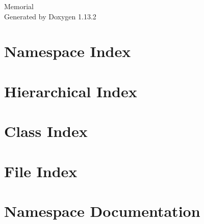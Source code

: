 \documentclass[twoside]{book}
\newcommand{\+}{\discretionary{\mbox{\scriptsize$\hookleftarrow$}}{}{}}
\newcommand{\clearemptydoublepage}{%
    \newpage{\pagestyle{empty}\cleardoublepage}%
  }
\begin{document}
  \raggedbottom
    \hypersetup{pageanchor=false,
                bookmarksnumbered=true,
                pdfencoding=unicode
               }
  \begin{titlepage}
  \vspace*{7cm}
  \begin{center}%
  {\Large Memorial}\\
  \vspace*{1cm}
  {\large Generated by Doxygen 1.13.2}\\
  \end{center}
  \end{titlepage}
  \clearemptydoublepage
  \tableofcontents
  \clearemptydoublepage
  \hypersetup{pageanchor=true}

\chapter{Namespace Index}

\chapter{Hierarchical Index}

\chapter{Class Index}

\chapter{File Index}

\chapter{Namespace Documentation}










\end{document}
